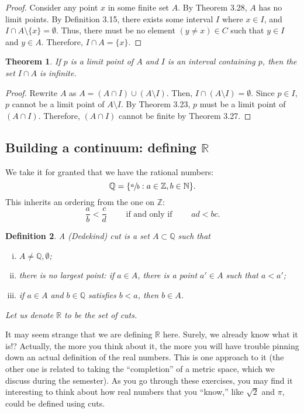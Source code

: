 \documentclass{amsart}
\newtheorem{theorem}{Theorem}
\newtheorem{definition}[theorem]{Definition}
\newcommand{\N}{\mathbb N}
\newcommand{\Q}{\mathbb Q}
\newcommand{\R}{\mathbb R}
\newcommand{\Z}{\mathbb Z}
\newcommand{\1}{\mathds{1}}
\def \R {{\mathbb {R}}}
\def \N {{\mathbb {N}}}
\def \Z {{\mathbb {Z}}}
\numberwithin{equation}{section}
\numberwithin{theorem}{section}
\begin{document}
\begin{proof}
	Consider any point $x$ in some finite set $A$. By Theorem 3.28, $A$ has no limit points. By Definition 3.15, there exists some interval $I$ where $x\in I$, and $I\cap A\setminus\{x\} =\emptyset$. Thus, there must be no element $(y\not=x)\in C$ such that $y\in I$ and $y\in A$. Therefore, $I\cap A = \{x\}$.
\end{proof}

\begin{theorem}  If $p$ is a limit point of $A$ and $I$ is an interval containing $p$, then the set $I \cap A$ is infinite.
\end{theorem}

\begin{proof}
	Rewrite $A$ as $A = (A\cap I) \cup (A\setminus I)$. Then, $I\cap (A\setminus I) = \emptyset$. Since $p\in I$, $p$ cannot be a limit point of $A\setminus I$. By Theorem 3.23, $p$ must be a limit point of $(A\cap I)$. Therefore,  $(A\cap I)$ cannot be finite by Theorem 3.27.
\end{proof}

\subsection{Building a continuum: defining $\R$}

We take it for granted that we have the rational numbers:
\[
\Q = \{ \sfrac{a}{b}: a \in \Z, b \in \N\}.
\]
This inherits an ordering from the one on $\Z$:
\[
\frac{a}{b} < \frac{c}{d}
\qquad\text{ if and only if }\qquad
ad < bc.
\]
\begin{definition}
	A (Dedekind) cut is a set $A \subset \Q$ such that
	\begin{enumerate}[(i)]
		
		\item $A \neq \Q,\emptyset$;
		
		\item there is no largest point: if $a \in A$, there is a point $a' \in A$ such that $a < a'$;
		
		\item if $a\in A$ and $b \in \Q$ satisfies $b<a$, then $b \in A$.
		
	\end{enumerate}
	Let us denote $\R$ to be the set of cuts.
\end{definition}

It may seem strange that we are defining $\R$ here.  Surely, we already know what it is!?  Actually, the more you think about it, the more you will have trouble pinning down an actual definition of the real numbers.  This is one approach to it (the other one is related to taking the ``completion'' of a metric space, which we discuss during the semester).  As you go through these exercises, you may find it interesting to think about how real numbers that you ``know,'' like $\sqrt 2$ and $\pi$, could be defined using cuts.
\end{document}
